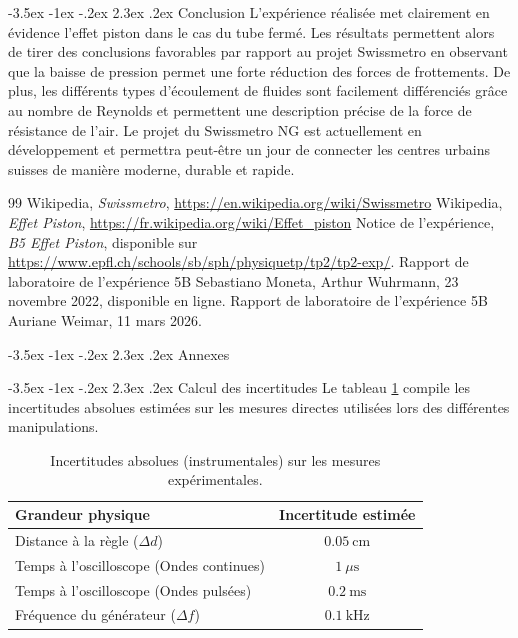 \documentclass[a4paper, 12pt,oneside]{article}
\makeatletter
\renewcommand{\section}{\@startsection {section}{1}{\z@}%
             {-3.5ex \@plus -1ex \@minus -.2ex}%
             {2.3ex \@plus.2ex}%
             {\normalfont\normalsize\bfseries}}
\renewcommand{\subsection}{\@startsection {subsection}{1}{\z@}%
             {-3.5ex \@plus -1ex \@minus -.2ex}%
             {2.3ex \@plus.2ex}%
             {\normalfont\normalsize\bfseries}}
\makeatother
\begin{document}
\section{Conclusion}
L'expérience réalisée met clairement en évidence l'effet piston dans le cas du tube fermé. Les résultats permettent alors de tirer des conclusions favorables par rapport au projet Swissmetro en observant que la baisse de pression permet une forte réduction des forces de frottements. De plus, les différents types d'écoulement de fluides sont facilement différenciés grâce au nombre de Reynolds et permettent une description précise de la force de résistance de l'air. Le projet du Swissmetro NG est actuellement en développement \cite{ref1} et permettra peut-être un jour de connecter les centres urbains suisses de manière moderne, durable et rapide.
%
\begin{thebibliography}{99}
Wikipedia, \textit{Swissmetro},
\url{https://en.wikipedia.org/wiki/Swissmetro}
Wikipedia, \textit{Effet Piston},
\url{https://fr.wikipedia.org/wiki/Effet_piston}
Notice de l'expérience, \textit{B5 Effet Piston}, disponible sur \url{https://www.epfl.ch/schools/sb/sph/physiquetp/tp2/tp2-exp/}.
Rapport de laboratoire de l'expérience 5B
Sebastiano Moneta, Arthur Wuhrmann, 23 novembre 2022, disponible en ligne.
Rapport de laboratoire de l'expérience 5B
Auriane Weimar, 11 mars 2026.

\end{thebibliography}
%

\section{Annexes}

\subsection{Calcul des incertitudes}
Le tableau \ref{tab:incertitudes_base} compile les incertitudes absolues estimées sur les mesures directes utilisées lors des différentes manipulations.

\begin{table}[h]
    \centering
    \begin{tabular}{|l|c|}
        \hline
        \textbf{Grandeur physique} & \textbf{Incertitude estimée} \\
        \hline
        Distance à la règle ($\Delta d$) & $0.05~\mathrm{cm}$ \\
        Temps à l'oscilloscope (Ondes continues) & $1~\mu\mathrm{s}$ \\
        Temps à l'oscilloscope (Ondes pulsées) & $0.2~\mathrm{ms}$ \\
        Fréquence du générateur ($\Delta f$) & $0.1~\mathrm{kHz}$ \\
        \hline
    \end{tabular}
    \caption{Incertitudes absolues (instrumentales) sur les mesures expérimentales.}
    \label{tab:incertitudes_base}
\end{table}
\end{document}
